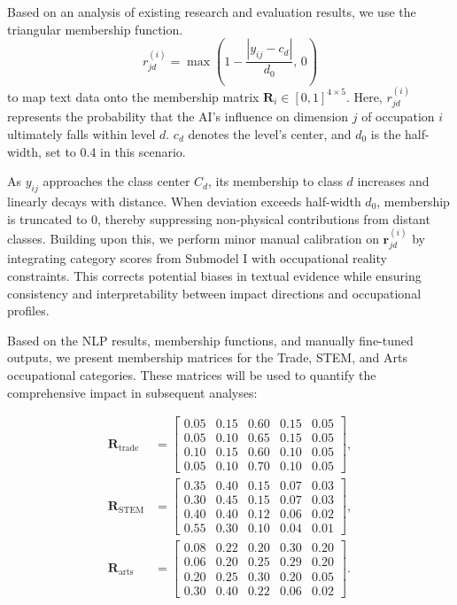 \documentclass{mcmthesis}
\begin{document}
Based on an analysis of existing research and evaluation results, we use the triangular membership function.
\begin{equation}
r_{jd}^{(i)}=\max\!\left(1-\frac{|y_{ij}-c_d|}{d_0},\,0\right)
\end{equation}
to map text data onto the membership matrix $\mathbf{R}_{i}\in[0,1]^{4\times 5}$. Here, $r_{jd}^{(i)}$ represents the probability that the AI's influence on dimension $j$ of occupation $i$ ultimately falls within level $d$. $c_d$ denotes the level's center, and $d_0$ is the half-width, set to 0.4 in this scenario.

As $y_{ij}$ approaches the class center $C_d$, its membership to class $d$ increases and linearly decays with distance. When deviation exceeds half-width $d_0$, membership is truncated to 0, thereby suppressing non-physical contributions from distant classes. Building upon this, we perform minor manual calibration on $\mathbf{r}_{jd}^{(i)}$ by integrating category scores from Submodel I with occupational reality constraints. This corrects potential biases in textual evidence while ensuring consistency and interpretability between impact directions and occupational profiles.


Based on the NLP results, membership functions, and manually fine-tuned outputs, we present membership matrices for the Trade, STEM, and Arts occupational categories. These matrices will be used to quantify the comprehensive impact in subsequent analyses:

\begin{align}
\mathbf{R}_{\text{trade}} &=
\begin{bmatrix}
0.05 & 0.15 & 0.60 & 0.15 & 0.05\\
0.05 & 0.10 & 0.65 & 0.15 & 0.05\\
0.10 & 0.15 & 0.60 & 0.10 & 0.05\\
0.05 & 0.10 & 0.70 & 0.10 & 0.05
\end{bmatrix}, \label{eq:R_trade}\\
\mathbf{R}_{\text{STEM}} &=
\begin{bmatrix}
0.35 & 0.40 & 0.15 & 0.07 & 0.03\\
0.30 & 0.45 & 0.15 & 0.07 & 0.03\\
0.40 & 0.40 & 0.12 & 0.06 & 0.02\\
0.55 & 0.30 & 0.10 & 0.04 & 0.01
\end{bmatrix}, \label{eq:R_stem}\\
\mathbf{R}_{\text{arts}} &=
\begin{bmatrix}
0.08 & 0.22 & 0.20 & 0.30 & 0.20\\
0.06 & 0.20 & 0.25 & 0.29 & 0.20\\
0.20 & 0.25 & 0.30 & 0.20 & 0.05\\
0.30 & 0.40 & 0.22 & 0.06 & 0.02
\end{bmatrix}. \label{eq:R_arts}
\end{align}
\end{document}
